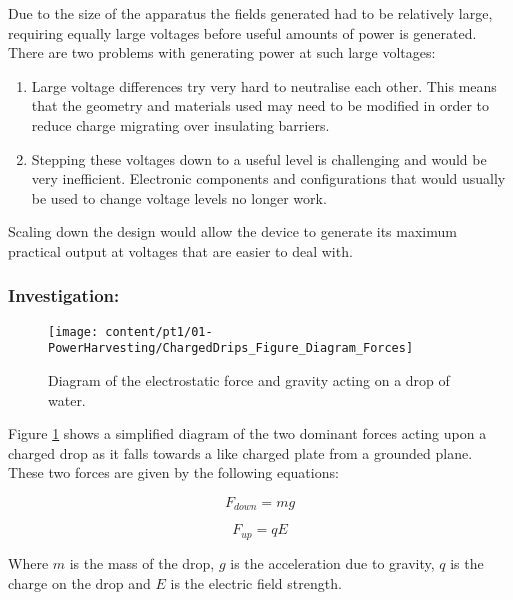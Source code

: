 Due to the size of the apparatus the fields generated had to be relatively
large, requiring equally large voltages before useful amounts of power
is generated. There are two problems with generating power at such
large voltages:
\begin{enumerate}
\item Large voltage differences try very hard to neutralise each other.
This means that the geometry and materials used may need to be modified
in order to reduce charge migrating over insulating barriers.
\item Stepping these voltages down to a useful level is challenging and
would be very inefficient. Electronic components and configurations
that would usually be used to change voltage levels no longer work.
\end{enumerate}
Scaling down the design would allow the device to generate its maximum
practical output at voltages that are easier to deal with.


\subsubsection{Investigation:}

\begin{figure}
\begin{centering}
\texttt{[image: content/pt1/01-PowerHarvesting/ChargedDrips\_Figure\_Diagram\_Forces]}
\par\end{centering}

\protect\caption{\label{Figure_Diagram_ChargedDrips_Figure_Diagram_Forces}Diagram
of the electrostatic force and gravity acting on a drop of water.}


\end{figure}


Figure \ref{Figure_Diagram_ChargedDrips_Figure_Diagram_Forces} shows
a simplified diagram of the two dominant forces acting upon a charged
drop as it falls towards a like charged plate from a grounded plane.
These two forces are given by the following equations:

\begin{equation}
F_{down}=mg
\end{equation}


\begin{equation}
F_{up}=qE
\end{equation}


Where $m$ is the mass of the drop, $g$ is the acceleration due to
gravity, $q$ is the charge on the drop and $E$ is the electric field
strength.